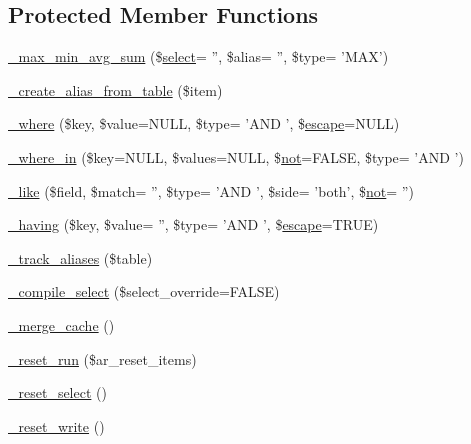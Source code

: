 \subsection*{Protected Member Functions}
\begin{DoxyCompactItemize}
\item 
\hyperlink{class_c_i___d_b__active__record_ab51e293829027327d05172aaf0720f70}{\-\_\-max\-\_\-min\-\_\-avg\-\_\-sum} (\$\hyperlink{class_c_i___d_b__active__record_ac6194faecb10a2731d6e6016f1714531}{select}= '', \$alias= '', \$type= 'M\-A\-X')
\item 
\hyperlink{class_c_i___d_b__active__record_a194edea7be9a8636b67b7d2c8a3de04e}{\-\_\-create\-\_\-alias\-\_\-from\-\_\-table} (\$item)
\item 
\hyperlink{class_c_i___d_b__active__record_acf021126513088c97575912f17979cd9}{\-\_\-where} (\$key, \$value=N\-U\-L\-L, \$type= 'A\-N\-D ', \$\hyperlink{class_c_i___d_b__driver_ac8f37ca5703d4558c732e692194f8cd6}{escape}=N\-U\-L\-L)
\item 
\hyperlink{class_c_i___d_b__active__record_a62678912baf752d3885888ea2dc311be}{\-\_\-where\-\_\-in} (\$key=N\-U\-L\-L, \$values=N\-U\-L\-L, \$\hyperlink{mathquill_8js_ac1e1ab538c27d68cc2cbafea74e7412c}{not}=F\-A\-L\-S\-E, \$type= 'A\-N\-D ')
\item 
\hyperlink{class_c_i___d_b__active__record_af8f104d471d9b9e82b9d05baf4af6e89}{\-\_\-like} (\$field, \$match= '', \$type= 'A\-N\-D ', \$side= 'both', \$\hyperlink{mathquill_8js_ac1e1ab538c27d68cc2cbafea74e7412c}{not}= '')
\item 
\hyperlink{class_c_i___d_b__active__record_af7242af6fdb53f7fa75bbb2162e7627f}{\-\_\-having} (\$key, \$value= '', \$type= 'A\-N\-D ', \$\hyperlink{class_c_i___d_b__driver_ac8f37ca5703d4558c732e692194f8cd6}{escape}=T\-R\-U\-E)
\item 
\hyperlink{class_c_i___d_b__active__record_afb539c1557a7cb20a190f5b68d96b74a}{\-\_\-track\-\_\-aliases} (\$table)
\item 
\hyperlink{class_c_i___d_b__active__record_a441f6e994a212cfa12dd33d92973915b}{\-\_\-compile\-\_\-select} (\$select\-\_\-override=F\-A\-L\-S\-E)
\item 
\hyperlink{class_c_i___d_b__active__record_aeee4c0cf664e1a65d7eb8a3c8e9970c6}{\-\_\-merge\-\_\-cache} ()
\item 
\hyperlink{class_c_i___d_b__active__record_a978ee07343d83abcdcb3a4ba7516b9b8}{\-\_\-reset\-\_\-run} (\$ar\-\_\-reset\-\_\-items)
\item 
\hyperlink{class_c_i___d_b__active__record_a7c6cc16411b9c36fbfd42a9317f64317}{\-\_\-reset\-\_\-select} ()
\item 
\hyperlink{class_c_i___d_b__active__record_ae49808f6becc0366eef957756c8309e4}{\-\_\-reset\-\_\-write} ()
\end{DoxyCompactItemize}


